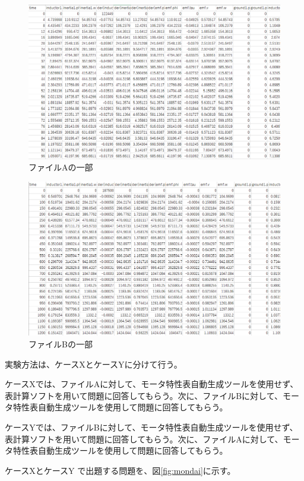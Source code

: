 \begin{figure}[t]
	\centering
	\includegraphics[width=13cm]{./Image/filea.png}
	\caption{ファイルAの一部}
	\label{fig:filea}
\end{figure}
\begin{figure}[t]
	\centering
	\includegraphics[width=13cm]{./Image/fileb.png}
	\caption{ファイルBの一部}
	\label{fig:fileb}
\end{figure}
実験方法は、ケースXとケースYに分けて行う。

ケースXでは、ファイルAに対して、モータ特性表自動生成ツールを使用せず、表計算ソフトを用いて問題に回答してもらう。次に、ファイルBに対して、モータ特性表自動生成ツールを使用して問題に回答してもらう。

ケースYでは、ファイルBに対して、モータ特性表自動生成ツールを使用せず、表計算ソフトを用いて問題に回答してもらう。次に、ファイルAに対して、モータ特性表自動生成ツールを使用して問題に回答してもらう。

ケースXとケースY で出題する問題を、図\ref{fig:mondai}に示す。

